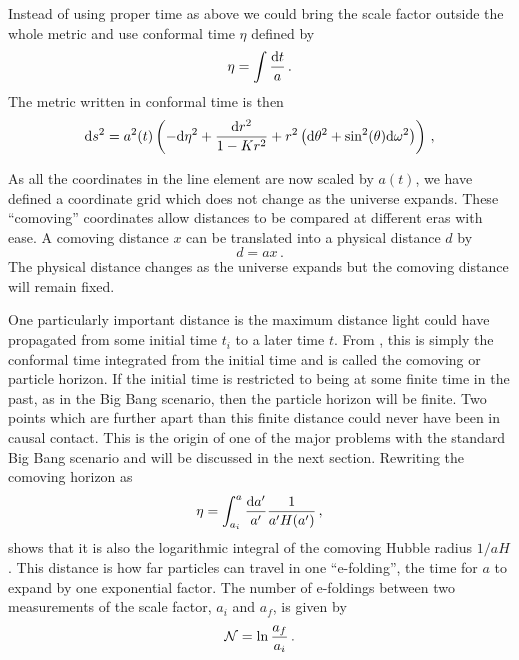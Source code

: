 Instead of using proper time as above we could bring
the scale factor outside the whole metric and use conformal time $\eta$
defined by
\begin{equation}
\label{eq:etatime-intro}
 \eta = \int\frac{\mathrm{d} t}{a}\,.
\end{equation}
% 
The metric written in conformal time is then 
% 
\begin{equation}
 \label{eq:frwconformal-intro}
\mathrm{d} s^2 = a^2(t)
  \left( -\mathrm{d}\eta^2 +
    \frac{\mathrm{d} r^2}{1-Kr^2} + r^2\left(\mathrm{d}\theta^2 + \sin^2(\theta)
\mathrm{d}\omega^2\right)
  \right)\,,
\end{equation}

% 
As all the coordinates in the line element are now scaled by $a(t)$, we
have defined a coordinate grid which does not change as the universe expands.
These ``comoving'' coordinates allow distances to be compared at different
eras with ease. A comoving distance $x$ can be translated into a physical
distance $d$ by
% 
\begin{equation}
 \label{eq:comovingdefn-intro}
 d = ax \,.
\end{equation}
The physical distance changes as the universe expands but the comoving distance
will remain fixed. 

One particularly important distance is the maximum distance light could have
propagated from some initial time $t_i$ to a later time $t$. From
, this is simply the conformal time integrated from
the initial time and is called the comoving or particle horizon.
If the initial time is restricted to
being at some finite time in the past, as in the Big Bang scenario, then the
particle horizon will be finite. Two points which are further apart than
this finite distance could never have been in causal contact. This
is the origin of one of the major problems with the standard Big Bang scenario
and will be discussed in the next section.
Rewriting the comoving horizon as
% 
\begin{equation}
 \eta = \int_{a_i}^a \frac{\mathrm{d} a'}{a'} \frac{1}{a' H(a')} \,,
\end{equation}
shows that it is also the logarithmic integral of the comoving Hubble
radius $1/aH$. This distance is how far particles can travel in one
``e-folding'', the time for $a$ to expand by one exponential factor. 
The number of e-foldings between two measurements of the scale factor, $a_i$
and $a_f$, is given by
\begin{equation}
\label{eq:nefolddefn-intro}
 \mathcal{N} = \ln \frac{a_f}{a_i}\,.
\end{equation}

